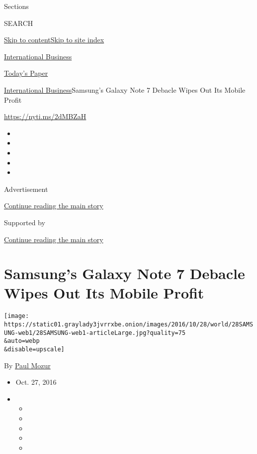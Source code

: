 Sections

SEARCH

\protect\hyperlink{site-content}{Skip to
content}\protect\hyperlink{site-index}{Skip to site index}

\href{https://www.nytimes3xbfgragh.onion/section/business}{International
Business}

\href{https://myaccount.nytimes3xbfgragh.onion/auth/login?response_type=cookie\&client_id=vi}{}

\href{https://www.nytimes3xbfgragh.onion/section/todayspaper}{Today's
Paper}

\href{/section/business}{International Business}\textbar{}Samsung's
Galaxy Note 7 Debacle Wipes Out Its Mobile Profit

\url{https://nyti.ms/2dMBZaH}

\begin{itemize}
\item
\item
\item
\item
\item
\end{itemize}

Advertisement

\protect\hyperlink{after-top}{Continue reading the main story}

Supported by

\protect\hyperlink{after-sponsor}{Continue reading the main story}

\hypertarget{samsungs-galaxy-note-7-debacle-wipes-out-its-mobile-profit}{%
\section{Samsung's Galaxy Note 7 Debacle Wipes Out Its Mobile
Profit}\label{samsungs-galaxy-note-7-debacle-wipes-out-its-mobile-profit}}

\texttt{[image: https://static01.graylady3jvrrxbe.onion/images/2016/10/28/world/28SAMSUNG-web1/28SAMSUNG-web1-articleLarge.jpg?quality=75\\\&auto=webp\\\&disable=upscale]}

By \href{https://www.nytimes3xbfgragh.onion/by/paul-mozur}{Paul Mozur}

\begin{itemize}
\item
  Oct. 27, 2016
\item
  \begin{itemize}
  \item
  \item
  \item
  \item
  \item
  \end{itemize}
\end{itemize}

